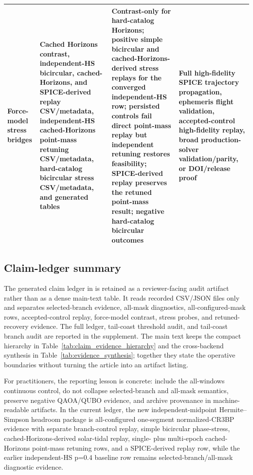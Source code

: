 \documentclass[preprint,12pt]{elsarticle}
\begin{document}
\begin{table}[t]
{{\begin{tabular}{p{}p{}p{}p{}}
Force-model stress bridges & Cached Horizons contrast, independent-HS bicircular, cached-Horizons, and SPICE-derived replay CSV/metadata, independent-HS cached-Horizons point-mass retuning CSV/metadata, hard-catalog bicircular stress CSV/metadata, and generated tables & Contrast-only for hard-catalog Horizons; positive simple bicircular and cached-Horizons-derived stress replays for the converged independent-HS row; persisted controls fail direct point-mass replay but independent retuning restores feasibility; SPICE-derived replay preserves the retuned point-mass result; negative hard-catalog bicircular outcomes & Full high-fidelity SPICE trajectory propagation, ephemeris flight validation, accepted-control high-fidelity replay, broad production-solver validation/parity, or DOI/release proof \\
\bottomrule
\end{tabular}}}
\end{table}

\subsection{Claim-ledger summary}

The generated claim ledger in  is retained as a reviewer-facing audit artifact rather than as a dense main-text table. It reads recorded CSV/JSON files only and separates selected-branch evidence, all-mask diagnostics, all-configured-mask rows, accepted-control replay, force-model contrast, stress probes, and retuned-recovery evidence. The full ledger, tail-coast threshold audit, and tail-coast branch audit are reported in the supplement. The main text keeps the compact hierarchy in Table~\ref{tab:claim_evidence_hierarchy} and the cross-backend synthesis in Table~\ref{tab:evidence_synthesis}; together they state the operative boundaries without turning the article into an artifact listing.

For practitioners, the reporting lesson is concrete: include the all-windows continuous control, do not collapse selected-branch and all-mask semantics, preserve negative QAOA/QUBO evidence, and archive provenance in machine-readable artifacts. In the current ledger, the new independent-midpoint Hermite--Simpson headroom package is all-configured one-segment normalized-CR3BP evidence with separate branch-control replay, simple bicircular phase-stress, cached-Horizons-derived solar-tidal replay, single- plus multi-epoch cached-Horizons point-mass retuning rows, and a SPICE-derived replay row, while the earlier independent-HS p=0.4 baseline row remains selected-branch/all-mask diagnostic evidence.
\end{document}
